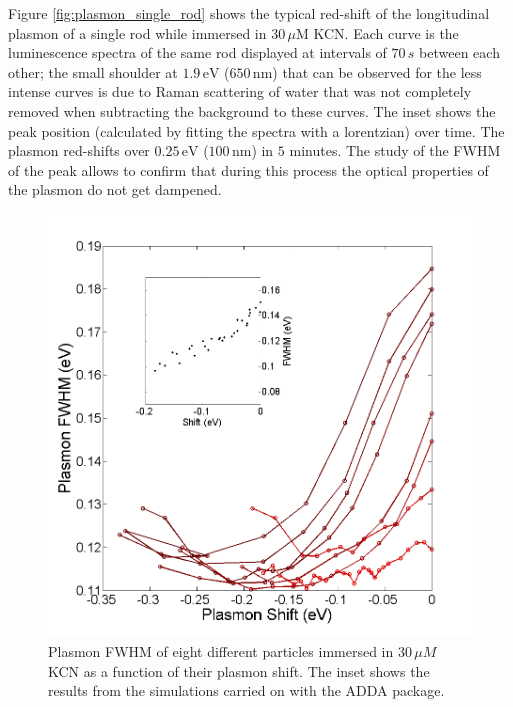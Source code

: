 \documentclass{article}
\begin{document}
Figure \ref{fig:plasmon_single_rod} shows the typical red-shift of the
longitudinal plasmon of a single rod while immersed in $30\,\mu\textrm{M}$ KCN.
Each curve is the luminescence spectra of the same rod displayed at intervals of
$70\,s$ between each other; the small shoulder at $1.9\,\textrm{eV}$
($650\,\textrm{nm}$) that can be observed for the less intense curves is due to
Raman scattering of water that was not completely removed when subtracting the
background to these curves. The inset shows the peak position (calculated by
fitting the spectra with a lorentzian) over time. The plasmon red-shifts over
$0.25\,\textrm{eV}$ ($100\,\textrm{nm}$) in $5$ minutes. The study of the FWHM
of the peak allows to confirm that during this process the optical properties
of the plasmon do not get dampened.

\begin{figure}[p]
 \centering
 \includegraphics[width=0.95\linewidth]{fwhm_several_in_eV.png}
 \caption{Plasmon FWHM of eight different particles immersed in $30\,\mu M$ KCN
 as a function of their plasmon shift. The inset shows the results from the
 simulations carried on with the ADDA package.}
 \label{fig:FWHM}
\end{figure}
\end{document}
